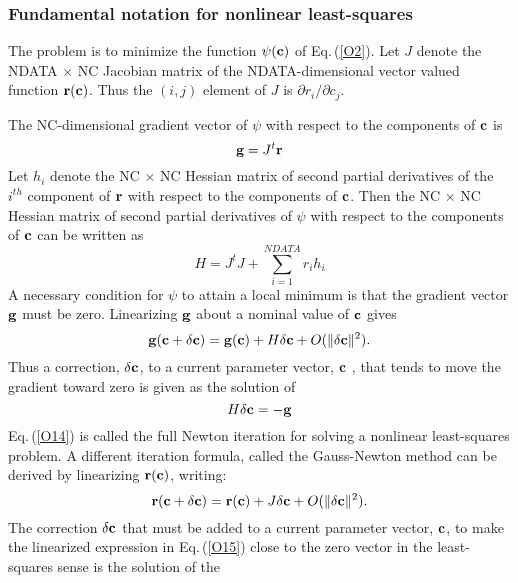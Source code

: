 \documentclass[twoside]{MATH77}
\begin{document}
\subsubsection{Fundamental notation for nonlinear least-squares}

The problem is to minimize the function $\psi ({\bf c})$ of Eq.\,(\ref{O2}).
Let $J$ denote the NDATA $\times $ NC Jacobian matrix of the NDATA-dimensional
vector valued function ${\bf r}({\bf c})$. Thus the $(i,j)$ element of $J$ is $%
\partial r_i/\partial c_j.$

The NC-dimensional gradient vector of $\psi $ with respect to the components
of ${\bf c}$ is%
\begin{equation*}
{\bf g}=J^t{\bf r}
\end{equation*}
Let $h_i$ denote the NC $\times $ NC Hessian matrix of second partial
derivatives of the $i^{th}$ component of ${\bf r}$ with respect to the
components of ${\bf c}$. Then the NC $\times $ NC Hessian matrix of second
partial derivatives of $\psi $ with respect to the components of ${\bf c}$
can be written as
\begin{equation}
\label{O12}H=J^tJ+\sum_{i=1}^{NDATA}r_ih_i
\end{equation}
A necessary condition for $\psi $ to attain a local minimum is that the
gradient vector ${\bf g}$ must be zero. Linearizing ${\bf g}$ about a
nominal value of ${\bf c}$ gives
\begin{equation}
\label{O13}{\bf g}({\bf c}+{\bf \delta c})={\bf g}({\bf c})+H{\bf \delta c}%
+O(\| {\bf \delta c}\| ^2).
\end{equation}
Thus a correction, ${\bf \delta c}$, to a current parameter vector, ${\bf c}$%
, that tends to move the gradient toward zero is given as the solution of
\begin{equation}
\label{O14}H{\bf \delta c}=-{\bf g}
\end{equation}
Eq.\,(\ref{O14}) is called the full Newton iteration for solving a nonlinear
least-squares problem.
A different iteration formula, called the Gauss-Newton method can be derived
by linearizing ${\bf r}({\bf c})$, writing:
\begin{equation}
\label{O15}{\bf r}({\bf c}+{\bf \delta c})={\bf r}({\bf c})+J{\bf \delta c}%
+O(\|{\bf \delta c}\|^2).
\end{equation}
The correction ${\bf \delta c}$ that must be added to a current parameter
vector, ${\bf c}$, to make the linearized expression in Eq.\,(\ref{O15})
close to the zero vector in the least-squares sense is the solution of the
\end{document}
